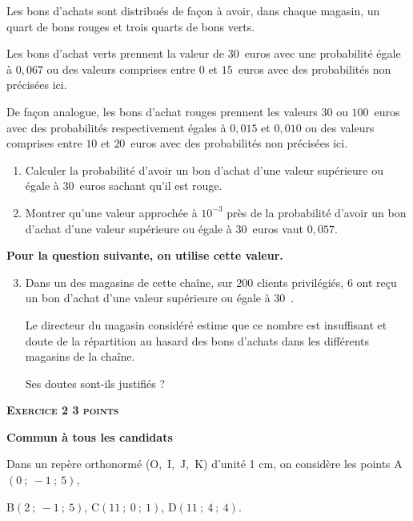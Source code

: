 \documentclass[10pt]{article}
\newcommand{\euro}{\eurologo{}}
\begin{document}
Les bons d'achats sont distribués de façon à avoir, dans chaque magasin, un quart de bons rouges et trois quarts de bons verts.
	
Les bons d'achat verts prennent la valeur de $30$~euros avec une probabilité égale à $0,067$ ou des valeurs comprises entre $0$ et $15$~euros avec des probabilités non précisées ici.
	
De façon analogue, les bons d'achat rouges prennent les valeurs $30$ ou $100$~euros avec des probabilités respectivement égales à $0,015$ et $0,010$ ou des valeurs comprises entre $10$ et $20$~euros avec des probabilités non précisées ici.

\medskip

\begin{enumerate}
\item Calculer la probabilité d'avoir un bon d'achat d'une valeur supérieure ou égale à $30$~euros sachant qu'il est rouge.
\item Montrer qu'une valeur approchée à $10^{-3}$ près de la probabilité d'avoir un bon d'achat d'une valeur supérieure ou égale à $30$~euros vaut $0,057$.

\end{enumerate}

\textbf{Pour la question suivante, on utilise cette valeur.}


\begin{enumerate}
\setcounter{enumi}{2}

\item Dans un des magasins de cette chaîne, sur $200$ clients privilégiés, $6$ ont reçu un bon d'achat d'une valeur supérieure ou égale à $30$~\euro.

\smallskip

Le directeur du magasin considéré estime que ce nombre est insuffisant et doute de la répartition
au hasard des bons d'achats dans les différents magasins de la chaîne.

Ses doutes sont-ils justifiés ?
\end{enumerate}

\vspace{0,5cm}

\textbf{\textsc{Exercice 2 \hfill 3 points}}

\textbf{Commun à tous les candidats} 

\medskip

Dans un repère orthonormé (O,~I,~J,~K) d'unité 1 cm, on considère les points A$(0~;~-1~;~5)$,

B$(2~;~-1~;~5)$, C$(11~;~0~;~1)$, D$(11~;~4~;~4)$.
\end{document}

